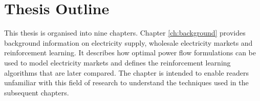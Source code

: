 

\section{Thesis Outline}
This thesis is organised into nine chapters.  Chapter
\ref{ch:background} provides background information on electricity supply,
wholesale electricity markets and reinforcement learning.  It describes how
optimal power flow formulations can be used to model electricity markets and
defines the reinforcement learning algorithms that are later compared. The
chapter is intended to enable readers unfamiliar with this field of research to
understand the techniques used in the subsequent chapters.

